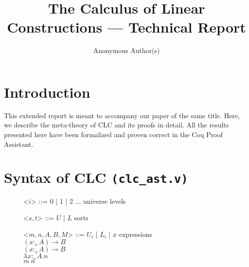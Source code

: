 \documentclass{article}
\title{The Calculus of Linear Constructions --- Technical Report}
\author{Anonymous Author(s)}
\theoremstyle{definition}
\newcommand{\indalt}[1][2]{\\\hspace*{-1.2em}\textbar\quad}
\begin{document}
\maketitle
\tableofcontents

\section{Introduction}
This extended report is meant to accompany our paper of the same title. Here, we describe the meta-theory of CLC and its proofs in detail. All the results presented here have been formalized and proven correct in the Coq Proof Assistant.

\section{Syntax of CLC \texttt{(clc_ast.v)}}
\begin{figure}[H]
  \begin{grammar}
    <$i$> ::= 0 | 1 | 2 ... \phantom{* |} \hspace*{2.4em} universe levels

    <$s, t$> ::= $U$ | $L$ \phantom{| $x$} \hspace*{4.6em} sorts

    <$m, n, A, B, M$> ::= $U_i$ | $L_i$ | $x$ \hspace*{4em} expressions
    \indalt $(x :_s A) \rightarrow B$
    \indalt $(x :_s A) \multimap B$
    \indalt $\lambda x :_s A. n$
    \indalt $m\ n$
  \end{grammar}
\end{figure}
\end{document}
